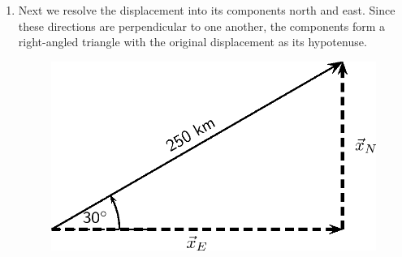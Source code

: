 {\begin{mdframed}[linewidth=4, leftmargin=40, rightmargin=40]
\begin{exercise}
\begin{enumerate}[noitemsep, label=\textbf{Step} \textbf{\arabic*}. ]
\begin{figure}[H]
\begin{center}
    \end{center}

 \end{figure}   

    \addtocounter{footnote}{-0}
    
      \par 
      \item  
      \label{m38819*id193100}Next we resolve the displacement into its components north and
east. Since these directions are perpendicular to one another, the
components form a right-angled triangle with the original displacement
as its hypotenuse.\par 
      \label{m38819*id193105}
        
    \setcounter{subfigure}{0}


	\begin{figure}[H] %
    \begin{center}
    \label{m38819*id193109!!!underscore!!!media}\label{m38819*id193109!!!underscore!!!printimage}\includegraphics{col11305.imgs/m38819_PG11C1_061.png} %
        
      \vspace{2pt}
    \vspace{.1in}
    
    \end{center}

 \end{figure}   

    \addtocounter{footnote}{-0}
    

\end{enumerate}
\end{exercise}
\end{mdframed}}
